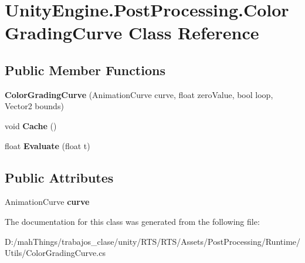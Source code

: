 \hypertarget{class_unity_engine_1_1_post_processing_1_1_color_grading_curve}{}\section{Unity\+Engine.\+Post\+Processing.\+Color\+Grading\+Curve Class Reference}
\label{class_unity_engine_1_1_post_processing_1_1_color_grading_curve}
\subsection*{Public Member Functions}
\begin{DoxyCompactItemize}
\item 
\mbox{\label{class_unity_engine_1_1_post_processing_1_1_color_grading_curve_ac68ca4da61fb2f9b5621f380319f43c3}} 
{\bfseries Color\+Grading\+Curve} (Animation\+Curve curve, float zero\+Value, bool loop, Vector2 bounds)
\item 
\mbox{\label{class_unity_engine_1_1_post_processing_1_1_color_grading_curve_a819bbd63f105f12ed7f341715088bf9b}} 
void {\bfseries Cache} ()
\item 
\mbox{\label{class_unity_engine_1_1_post_processing_1_1_color_grading_curve_af89e9253ac0366e5094cd59edc6933cb}} 
float {\bfseries Evaluate} (float t)
\end{DoxyCompactItemize}
\subsection*{Public Attributes}
\begin{DoxyCompactItemize}
\item 
\mbox{\label{class_unity_engine_1_1_post_processing_1_1_color_grading_curve_a9d614d239251bd42db12ad55b509f316}} 
Animation\+Curve {\bfseries curve}
\end{DoxyCompactItemize}


The documentation for this class was generated from the following file\+:\begin{DoxyCompactItemize}
\item 
D\+:/mah\+Things/trabajos\+\_\+clase/unity/\+R\+T\+S/\+R\+T\+S/\+Assets/\+Post\+Processing/\+Runtime/\+Utils/Color\+Grading\+Curve.\+cs\end{DoxyCompactItemize}
